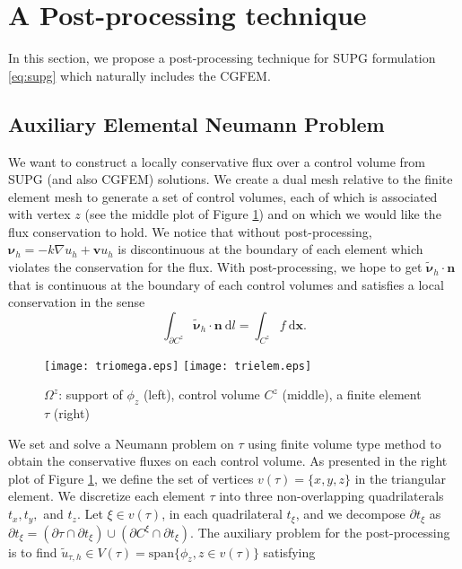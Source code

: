 \documentclass[times]{nlaauth}
\numberwithin{equation}{section}
\begin{document}
\section{A Post-processing technique}  \label{sec:pp}

\noindent
In this section, we propose a post-processing technique for SUPG formulation \eqref{eq:supg} which naturally includes the CGFEM.

\subsection{Auxiliary Elemental Neumann Problem} \label{sec:bvp}

We want to construct a locally conservative flux over a control volume from SUPG
(and also  CGFEM) solutions.
We create a dual mesh relative to the finite element mesh to generate a set of control volumes, each of which is associated with vertex $z$ (see the middle plot of Figure \ref{fig:taucv}) and on which we would like the flux conservation to hold. We notice that without post-processing, $\boldsymbol{\nu}_h = -k \nabla u_h + \boldsymbol{v}u_h$ is discontinuous at the boundary of each element which violates the conservation for the flux. With post-processing, we hope to get $\widetilde {\boldsymbol{\nu}}_h \cdot \boldsymbol{n}$ that is continuous at the boundary of each control volumes and satisfies a local conservation in the sense
\begin{equation} \label{eq:cvconservation}
\int_{\partial C^z} \widetilde {\boldsymbol{\nu}}_h \cdot \boldsymbol{n}  \ \text{d} l = \int_{C^z} f \ \text{d} \boldsymbol{x}. 
\end{equation}

\begin{figure}[ht]
\centering
\texttt{[image: triomega.eps]}  \hspace*{0.45cm}
\texttt{[image: trielem.eps]}
\caption{$\Omega^z$: support of $\phi_z$ (left), control volume $C^z$ (middle), a finite element $\tau$ (right) }\label{fig:taucv}
\end{figure}

We set and solve a Neumann problem on $\tau$ using finite volume type method to obtain the conservative fluxes on each control volume. As presented in the right plot of Figure \ref{fig:taucv}, we define the set of vertices $v(\tau) = \{ x, y, z \}$ in the triangular element. We discretize each element $\tau$ into three non-overlapping quadrilaterals $t_x, t_y,$ and $t_z$. Let $ \xi \in v(\tau) $, in each quadrilateral $t_\xi$, and we decompose $\partial t_\xi $ as $\partial t_\xi = ( \partial \tau \cap \partial t_\xi ) \cup ( \partial C^\xi \cap \partial t_\xi ).$  The auxiliary problem for the post-processing is to find $\widetilde u_{\tau, h} \in V(\tau) =\text{span}\{ \phi_z, z \in v(\tau)\}$ satisfying 
\end{document}
